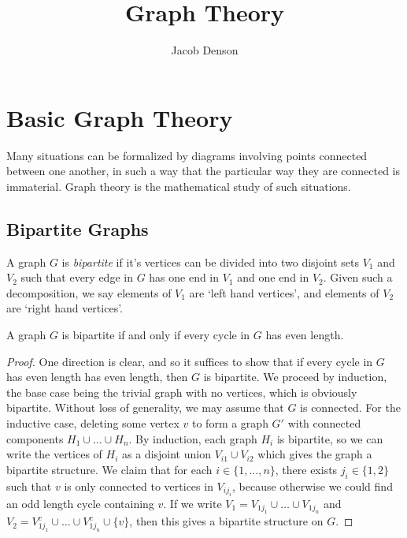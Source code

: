 

\title{Graph Theory}
\author{Jacob Denson}




\maketitle

\tableofcontents


\chapter{Basic Graph Theory}

Many situations can be formalized by diagrams involving points connected between one another, in such a way that the particular way they are connected is immaterial. Graph theory is the mathematical study of such situations.

\section{Bipartite Graphs}

A graph $G$ is \emph{bipartite} if it's vertices can be divided into two disjoint sets $V_1$ and $V_2$ such that every edge in $G$ has one end in $V_1$ and one end in $V_2$. Given such a decomposition, we say elements of $V_1$ are `left hand vertices', and elements of $V_2$ are `right hand vertices'.

\begin{theorem}
	A graph $G$ is bipartite if and only if every cycle in $G$ has even length.
\end{theorem}
\begin{proof}
	One direction is clear, and so it suffices to show that if every cycle in $G$ has even length has even length, then $G$ is bipartite. We proceed by induction, the base case being the trivial graph with no vertices, which is obviously bipartite. Without loss of generality, we may assume that $G$ is connected. For the inductive case, deleting some vertex $v$ to form a graph $G'$ with connected components $H_1 \cup \dots \cup H_n$. By induction, each graph $H_i$ is bipartite, so we can write the vertices of $H_i$ as a disjoint union $V_{i1} \cup V_{i2}$ which gives the graph a bipartite structure. We claim that for each $i \in \{ 1, \dots, n \}$, there exists $j_i \in \{ 1, 2 \}$ such that $v$ is only connected to vertices in $V_{i j_i}$, because otherwise we could find an odd length cycle containing $v$. If we write $V_1 = V_{1j_1} \cup \dots \cup V_{1j_n}$ and $V_2 = V_{1j_1}^c \cup \dots \cup V_{1j_n}^c \cup \{ v \}$, then this gives a bipartite structure on $G$.
\end{proof}

